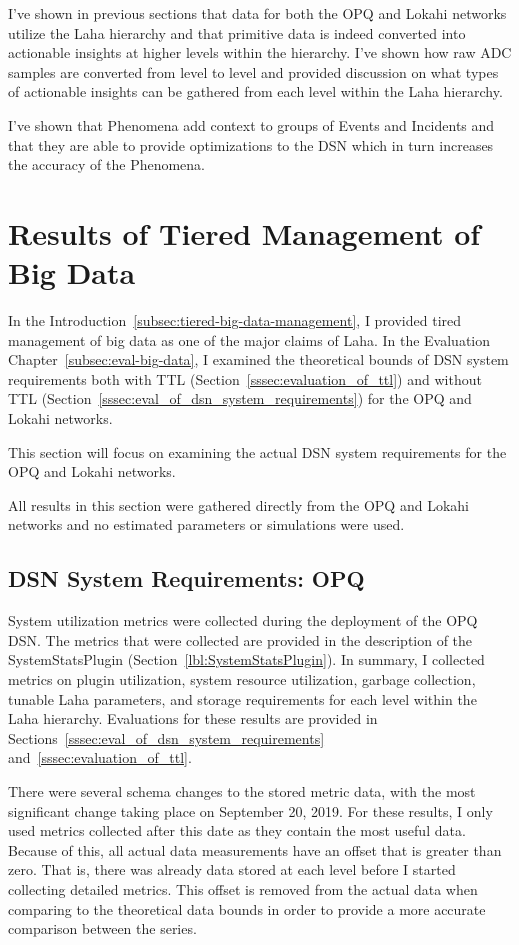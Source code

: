 I've shown in previous sections that data for both the OPQ and Lokahi networks utilize the Laha hierarchy and that primitive data is indeed converted into actionable insights at higher levels within the hierarchy. I've shown how raw ADC samples are converted from level to level and provided discussion on what types of actionable insights can be gathered from each level within the Laha hierarchy.

I've shown that Phenomena add context to groups of Events and Incidents and that they are able to provide optimizations to the DSN which in turn increases the accuracy of the Phenomena.

\section{Results of Tiered Management of Big Data}\label{sec:dsn-system-requirements}

In the Introduction~\ref{subsec:tiered-big-data-management}, I provided tired management of big data as one of the major claims of Laha. In the Evaluation Chapter~\ref{subsec:eval-big-data}, I examined the theoretical bounds of DSN system requirements both with TTL (Section~\ref{sssec:evaluation_of_ttl}) and without TTL (Section~\ref{sssec:eval_of_dsn_system_requirements}) for the OPQ and Lokahi networks.

This section will focus on examining the actual DSN system requirements for the OPQ and Lokahi networks.

All results in this section were gathered directly from the OPQ and Lokahi networks and no estimated parameters or simulations were used.

\subsection{DSN System Requirements: OPQ}\label{subsec:dsn-system-requirements:-opq}

System utilization metrics were collected during the deployment of the OPQ DSN. The metrics that were collected are provided in the description of the SystemStatsPlugin (Section~\ref{lbl:SystemStatsPlugin}). In summary, I collected metrics on plugin utilization, system resource utilization, garbage collection, tunable Laha parameters, and storage requirements for each level within the Laha hierarchy. Evaluations for these results are provided in Sections~\ref{sssec:eval_of_dsn_system_requirements} and~\ref{sssec:evaluation_of_ttl}.

There were several schema changes to the stored metric data, with the most significant change taking place on September 20, 2019. For these results, I only used metrics collected after this date as they contain the most useful data. Because of this, all actual data measurements have an offset that is greater than zero. That is, there was already data stored at each level before I started collecting detailed metrics. This offset is removed from the actual data when comparing to the theoretical data bounds in order to provide a more accurate comparison between the series.

